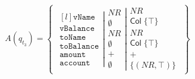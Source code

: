 \begin{align}
    A(q_{t_3})=\left\{\begin{matrix}
                          \left.\begin{matrix*}[l]
                                    \texttt{vName}\\
                                    \texttt{vBalance}\\
                                    \texttt{toName}\\
                                    \texttt{toBalance}\\
                                    \texttt{amount}\\
                                    \texttt{account}
                          \end{matrix*}\right|
                          \left.\begin{matrix}
                                    NR\\
                                    \emptyset\\
                                    NR\\
                                    \emptyset\\
                                    +\\
                                    \emptyset
                          \end{matrix}\right|
                          \begin{matrix}
                              NR\\
                              \mathsf{Col} \; \{\top\}\\
                              NR\\
                              \mathsf{Col} \; \{\top\}\\
                              +\\
                              \{(NR, \top)\}
                          \end{matrix}
    \end{matrix}\right\}
\end{align}

